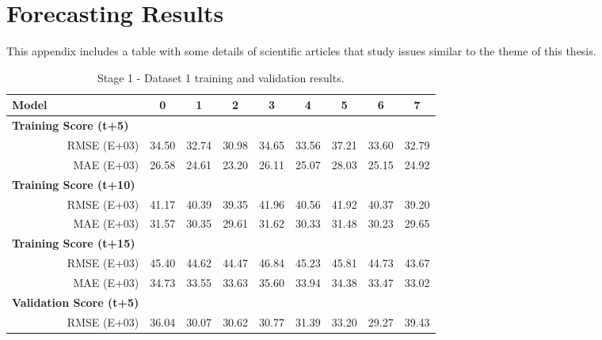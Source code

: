\chapter{Forecasting Results}


\label{chapter:appendixD}

This appendix includes a table with some details of scientific articles that study issues similar to the theme of this thesis.



\begin{table}[htbp]
  \centering
  \caption{Stage 1 - Dataset 1 training and validation results.}
    \begin{tabular}{cr|cccccccc}
    \toprule
    \multicolumn{1}{l}{\textbf{Model}} &       & 0     & 1     & 2     & 3     & 4     & 5     & 6     & 7 \\
    \midrule
    \multicolumn{2}{l|}{\textbf{Training Score (t+5)}} &       &       &       &       &       &       &       &  \\
          & RMSE (E+03) & 34.50 & 32.74 & 30.98 & 34.65 & 33.56 & 37.21 & 33.60 & 32.79 \\
          & MAE (E+03) & 26.58 & 24.61 & 23.20 & 26.11 & 25.07 & 28.03 & 25.15 & 24.92 \\
    \multicolumn{2}{l|}{\textbf{Training Score (t+10)}} &       &       &       &       &       &       &       &  \\
          & RMSE (E+03) & 41.17 & 40.39 & 39.35 & 41.96 & 40.56 & 41.92 & 40.37 & 39.20 \\
          & MAE (E+03) & 31.57 & 30.35 & 29.61 & 31.62 & 30.33 & 31.48 & 30.23 & 29.65 \\
    \multicolumn{2}{l|}{\textbf{Training Score (t+15)}} &       &       &       &       &       &       &       &  \\
          & RMSE (E+03) & 45.40 & 44.62 & 44.47 & 46.84 & 45.23 & 45.81 & 44.73 & 43.67 \\
          & MAE (E+03) & 34.73 & 33.55 & 33.63 & 35.60 & 33.94 & 34.38 & 33.47 & 33.02 \\
    \midrule
    \multicolumn{2}{l|}{\textbf{Validation Score (t+5)}} &       &       &       &       &       &       &       &  \\
          & RMSE (E+03) & 36.04 & 30.07 & 30.62 & 30.77 & 31.39 & 33.20 & 29.27 & 39.43 \\

\end{tabular}
\end{table}
